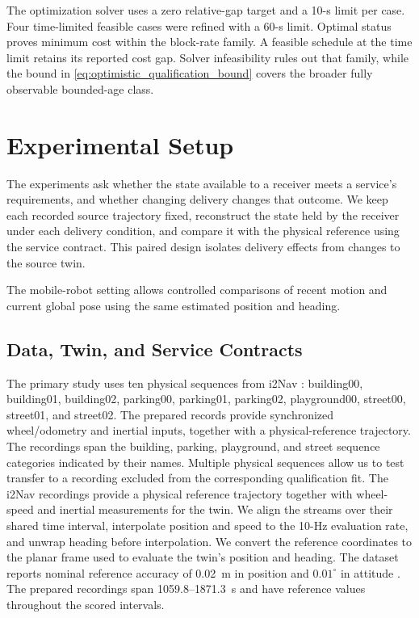 \documentclass[journal]{IEEEtran}
\newcommand{\rev}[1]{#1}
\begin{document}
\rev{The optimization solver uses a zero relative-gap target and a 10-s limit per case.
Four time-limited feasible cases were refined with a 60-s limit.
Optimal status proves minimum cost within the block-rate family.
A feasible schedule at the time limit retains its reported cost gap.
Solver infeasibility rules out that family, while the bound in
\eqref{eq:optimistic_qualification_bound} covers the broader fully
observable bounded-age class.}
\section{Experimental Setup}
\label{sec:exp_setup}

The experiments ask whether the state available to a receiver meets a
service's requirements, and whether changing delivery changes that outcome.
We keep each recorded source trajectory fixed, reconstruct the state held
by the receiver under each delivery condition, and compare it with the
physical reference using the service contract. This paired design isolates
delivery effects from changes to the source twin.

The mobile-robot setting allows controlled comparisons of recent motion
and current global pose using the same estimated position and heading.

\subsection{Data, Twin, and Service Contracts}

The primary study uses ten physical sequences from i2Nav
\cite{tang2025i2nav}: building00, building01, building02, parking00,
parking01, parking02, playground00, street00, street01, and street02.
The prepared records provide synchronized wheel/odometry and inertial
inputs, together with a physical-reference trajectory. The recordings span
the building, parking, playground, and street sequence categories indicated
by their names. Multiple physical sequences allow us to test transfer to a
recording excluded from the corresponding qualification fit.
\rev{The i2Nav recordings provide a physical reference trajectory together
with wheel-speed and inertial measurements for the twin. We align the
streams over their shared time interval, interpolate position and speed
to the 10-Hz evaluation rate, and unwrap heading before interpolation.
We convert the reference coordinates to the planar frame used to evaluate the twin’s position and heading. The dataset reports
nominal reference accuracy of 0.02~m in position and $0.01^\circ$ in
attitude \cite{i2navRobotDocumentation}. The prepared recordings span
1059.8--1871.3~s and have reference values throughout the scored
intervals.}
\end{document}

